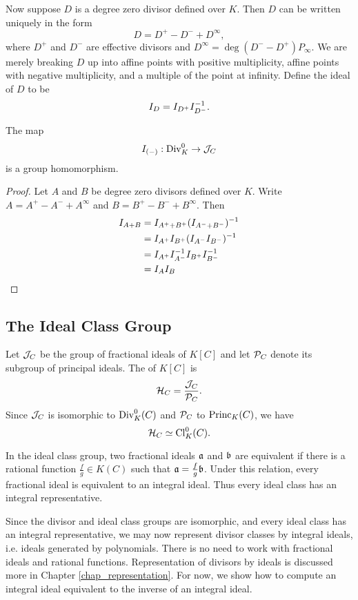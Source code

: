 Now suppose $D$ is a degree zero divisor defined over $K$.
Then $D$ can be written uniquely in the form
  \[ D = D^+ - D^- + D^\infty, \]
where $D^+$ and $D^-$ are effective divisors and $D^\infty = \deg(D^- - D^+)P_\infty$.
We are merely breaking $D$ up into affine points with positive multiplicity,
affine points with negative multiplicity, and a multiple of the point at infinity.
Define the ideal of $D$ to be
\[ I_D = I_{D^+}I_{D^-}\inv. \]
\begin{theorem}
  The map 
    \[ I_{(-)} : \Div_K^0 \to \cal J_C \]
  is a group homomorphism.
\end{theorem}
\begin{proof}
  Let $A$ and $B$ be degree zero divisors defined over $K$.
  Write $A = A^+ - A^- + A^\infty$ and $B = B^+ - B^- + B^\infty$.
  Then
  \begin{align*}
    I_{A + B}
      &= I_{A^+ + B^+}(I_{A^- + B^-})\inv \\
      &= I_{A^+}I_{B^+}(I_{A^-}I_{B^-})\inv \\
      &= I_{A^+} I_{A^-}\inv I_{B^+} I_{B^-}\inv \\
      &= I_A I_B \\
  \end{align*}
\end{proof}




\subsection{The Ideal Class Group}

Let $\cal J_C$ be the group of fractional ideals of $K[C]$ and let $\cal P_C$ denote its subgroup of principal ideals.
The  of $K[C]$ is
\[ \cal H_C = \frac {\cal J_C} {\cal P_C}. \]
Since $\cal J_C$ is isomorphic to $\Div_K^0(C)$ and $\cal P_C$ to $\Princ_K(C)$, we have
\[ \cal H_C \simeq \Cl_K^0(C). \]

In the ideal class group, two fractional ideals $\frak a$ and $\frak b$ are equivalent
if there is a rational function $\frac f g \in K(C)$ such that $\frak a = \frac f g \frak b$.
Under this relation, every fractional ideal is equivalent to an integral ideal.
Thus every ideal class has an integral representative.

Since the divisor and ideal class groups are isomorphic, and every ideal class has an integral representative,
we may now represent divisor classes by integral ideals, i.e. ideals generated by polynomials.
There is no need to work with fractional ideals and rational functions.
Representation of divisors by ideals is discussed more in Chapter \ref{chap_representation}.
For now, we show how to compute an integral ideal equivalent to the inverse of an integral ideal. 

